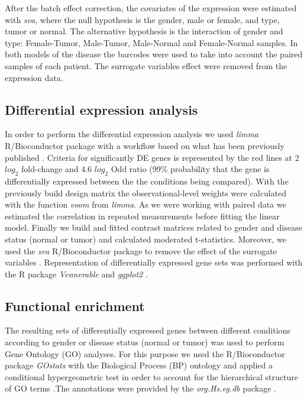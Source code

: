\documentclass[9pt,twocolumn,twoside]{gsajnl}
\begin{document}
After the batch effect correction, the covariates of the expression were estimated with \textit{sva}, where the null hypothesis is the gender, male or female, and type, tumor or normal. The alternative hypothesis is the interaction of gender and type: Female-Tumor, Male-Tumor, Male-Normal and Female-Normal samples. In both models of the disease the barcodes were used to take into account the paired samples of each patient. The surrogate variables effect were removed from the expression data.

\subsection*{Differential expression analysis} 
\label{subsec:de}
In order to perform the differential expression analysis we used \textit{limma} R/Bioconductor package with a workflow based on what has been previously published \citep{limma}. Criteria for significantly DE genes is represented by the red lines at 2 $log_{2}$ fold-change and 4.6 $log_{2}$ Odd ratio (99\% probability that the gene is differentially expressed between the the conditions being compared). With the previously build design matrix the observational-level weights were calculated with the function \textit{voom} from \textit{limma}. As we were working with paired data we estimated the correlation in repeated measurements before fitting the linear model. Finally we build and fitted contrast matrices related to gender and disease status (normal or tumor) and calculated moderated t-statistics. Moreover, we used the \textit{sva} R/Bioconductor package to remove the effect of the surrogate variables \citep{sva}. Representation of differentially expressed gene sets was performed with the R package \textit{Vennerable} \citep{Venn} and \textit{ggplot2} \citep{ggplot2}.

\subsection*{Functional enrichment}
The resulting sets of differentially expressed genes between different conditions according to gender or disease status (normal or tumor) was used to perform Gene Ontology (GO) analyses. For this purpose we used the R/Bioconductor package \textit{GOstats} with the Biological Process (BP) ontology and applied a conditional hypergeometric test in order to account for the hierarchical structure of GO terms \citep{Gostats}.The annotations were provided by the \textit{org.Hs.eg.db} package \citep{org}. 
\end{document}
